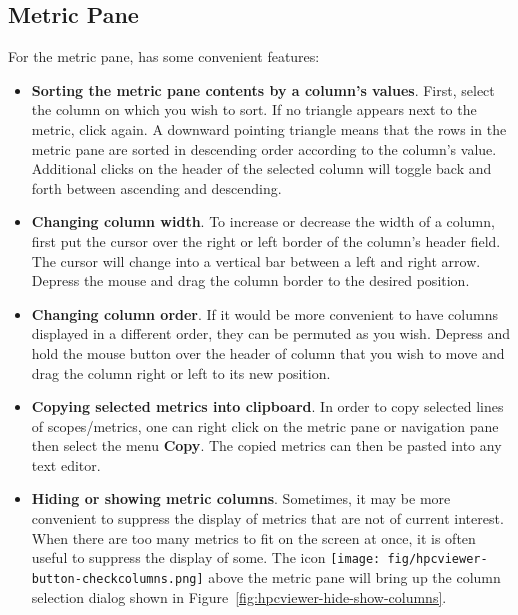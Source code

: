 \subsection{Metric Pane}
\label{sec:hpcviewer:metric-pane}

For the metric pane, \hpcviewer{} has some convenient features:
\begin{itemize}

\item \textbf{Sorting the metric pane contents by a column's values}.
  First, select the column on which you wish to sort.
  If no triangle appears next to the metric, click again.
  A downward pointing triangle means that the rows in the metric pane are sorted in descending order according to the column's value.
  Additional clicks on the header of the selected column will toggle back and forth between ascending and descending.

\item \textbf{Changing column width}.
  To increase or decrease the width of a column, first put the cursor over the right or left border of the column's header field.
  The cursor will change into a vertical bar between a left and right arrow.
  Depress the mouse and drag the column border to the desired position.

\item \textbf{Changing column order}.
  If it would be more convenient to have columns displayed in a different order, they can be permuted as you wish.
  Depress and hold the mouse button over the header of column that you wish to move and drag the column right or left to its new position.

\item \textbf{Copying selected metrics into clipboard}.
  In order to copy selected lines of scopes/metrics, one can right click on the metric pane or navigation pane then select the menu \textbf{Copy}.
  The copied metrics can then be pasted into any text editor.

\item \textbf{Hiding or showing metric columns}.
  Sometimes, it may be more convenient to suppress the display of metrics that are not of current interest.
  When there are too many metrics to fit on the screen at once, it is often useful to suppress the display of some.
  The icon \texttt{[image: fig/hpcviewer-button-checkcolumns.png]} above the metric pane will bring up the column selection dialog shown in Figure~\ref{fig:hpcviewer-hide-show-columns}.


\end{itemize}
